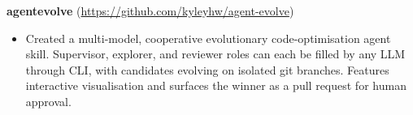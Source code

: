 {%
\textbf{agent\raisebox{3.46pt}{\_}\EndAccSupp{}evolve} (\url{https://github.com/kyleyhw/agent-evolve})
\cvlistgap
\begin{itemize}
    \item Created a multi-model, cooperative evolutionary code-optimisation agent skill. Supervisor, explorer, and reviewer roles can each be filled by any LLM through CLI, with candidates evolving on isolated git branches. Features interactive visualisation and surfaces the winner as a pull request for human approval.
\end{itemize}
}
